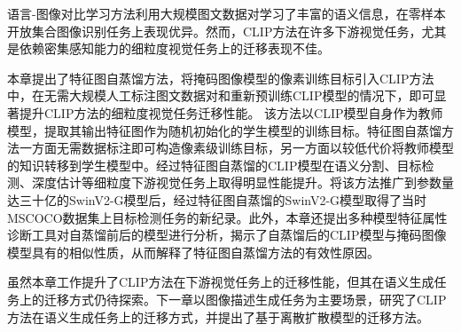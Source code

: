 
语言-图像对比学习方法利用大规模图文数据对学习了丰富的语义信息，在零样本开放集合图像识别任务上表现优异。然而，CLIP方法在许多下游视觉任务，尤其是依赖密集感知能力的细粒度视觉任务上的迁移表现不佳。

本章提出了特征图自蒸馏方法，将掩码图像模型的像素训练目标引入CLIP方法中，在无需大规模人工标注图文数据对和重新预训练CLIP模型的情况下，即可显著提升CLIP方法的细粒度视觉任务迁移性能。
该方法以CLIP模型自身作为教师模型，提取其输出特征图作为随机初始化的学生模型的训练目标。特征图自蒸馏方法一方面无需数据标注即可构造像素级训练目标，另一方面以较低代价将教师模型的知识转移到学生模型中。经过特征图自蒸馏的CLIP模型在语义分割、目标检测、深度估计等细粒度下游视觉任务上取得明显性能提升。将该方法推广到参数量达三十亿的SwinV2-G模型后，经过特征图自蒸馏的SwinV2-G模型取得了当时MSCOCO数据集上目标检测任务的新纪录。此外，本章还提出多种模型特征属性诊断工具对自蒸馏前后的模型进行分析，揭示了自蒸馏后的CLIP模型与掩码图像模型具有的相似性质，从而解释了特征图自蒸馏方法的有效性原因。

虽然本章工作提升了CLIP方法在下游视觉任务上的迁移性能，但其在语义生成任务上的迁移方式仍待探索。下一章以图像描述生成任务为主要场景，研究了CLIP方法在语义生成任务上的迁移方式，并提出了基于离散扩散模型的迁移方法。